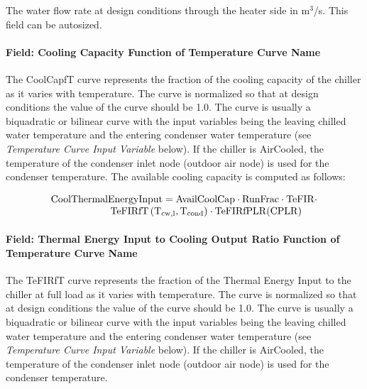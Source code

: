 The water flow rate at design conditions through the heater side in m\(^{3}\)/s. This field can be autosized.

\paragraph{Field: Cooling Capacity Function of Temperature Curve Name}\label{field-cooling-capacity-function-of-temperature-curve-name-3}

The CoolCapfT curve represents the fraction of the cooling capacity of the chiller as it varies with temperature. The curve is normalized so that at design conditions the value of the curve should be 1.0. The curve is usually a biquadratic or bilinear curve with the input variables being the leaving chilled water temperature and the entering condenser water temperature (see \emph{Temperature Curve Input Variable} below). If the chiller is AirCooled, the temperature of the condenser inlet node (outdoor air node) is used for the condenser temperature. The available cooling capacity is computed as follows:

\begin{equation}
    \begin{array}{l}
        \rm{CoolThermalEnergyInput} = \rm{AvailCoolCap} \cdot \rm{RunFrac} \cdot \rm{TeFIR} \cdot \\
        \quad \quad \quad \quad \quad \quad \rm{TeFIRfT} \left( T_{cw,l}, T_{cond} \right) \cdot \rm{TeFIRfPLR}( \rm{CPLR} )
    \end{array}
\end{equation}

\paragraph{Field: Thermal Energy Input to Cooling Output Ratio Function of Temperature Curve Name}\label{field-thermal-energy-input-to-cooling-output-ratio-function-of-temperature-curve-name}

The TeFIRfT curve represents the fraction of the Thermal Energy Input to the chiller at full load as it varies with temperature. The curve is normalized so that at design conditions the value of the curve should be 1.0. The curve is usually a biquadratic or bilinear curve with the input variables being the leaving chilled water temperature and the entering condenser water temperature (see \emph{Temperature Curve Input Variable} below). If the chiller is AirCooled, the temperature of the condenser inlet node (outdoor air node) is used for the condenser temperature.

